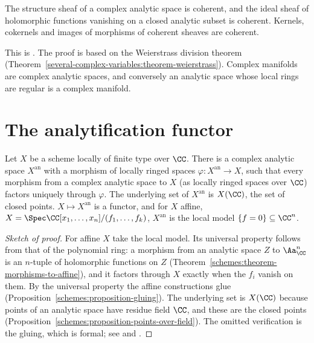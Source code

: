 \begin{theorem}\label{gaga:theorem-oka-cartan}
The structure sheaf of a complex analytic space is coherent, and the ideal sheaf of holomorphic functions vanishing on a closed analytic subset is coherent.
Kernels, cokernels and images of morphisms of coherent sheaves are coherent.
\end{theorem}

This is \cite[Chapters 2 and 4]{grauert-remmert}. The proof is based on the Weierstrass division theorem
(Theorem~\ref{several-complex-variables:theorem-weierstrass}). Complex manifolds are complex analytic spaces, and conversely an analytic space whose local
rings are regular is a complex manifold.

\section{The analytification functor}\label{gaga:section-analytification}

\begin{proposition}\label{gaga:proposition-analytification}
Let $X$ be a scheme locally of finite type over $\CC$. There is a complex analytic space $X^{\mathrm{an}}$ with a morphism of locally ringed spaces
$\varphi \colon X^{\mathrm{an}} \to X$, such that every morphism from a complex analytic space to $X$ (as locally ringed spaces over $\CC$) factors uniquely through
$\varphi$. The underlying set of $X^{\mathrm{an}}$ is $X(\CC)$, the set of closed points. $X \mapsto X^{\mathrm{an}}$ is a functor, and for $X$ affine,
$X = \Spec\CC[x_1, \ldots, x_n]/(f_1, \ldots, f_k)$, $X^{\mathrm{an}}$ is the local model $\{f = 0\} \subseteq \CC^n$.
\end{proposition}

\begin{proof}[Sketch of proof]
For affine $X$ take the local model. Its universal property follows from that of the polynomial ring: a morphism from an analytic space $Z$ to $\Aa^n_\CC$ is an
$n$-tuple of holomorphic functions on $Z$ (Theorem~\ref{schemes:theorem-morphisms-to-affine}), and it factors through $X$ exactly when the $f_i$ vanish on them. By the
universal property the affine constructions glue (Proposition~\ref{schemes:proposition-gluing}). The underlying set is $X(\CC)$ because points of an analytic space
have residue field $\CC$, and these are the closed points (Proposition~\ref{schemes:proposition-points-over-field}). The omitted verification is the gluing,
which is formal; see \cite[Appendix B]{hartshorne-ag} and \cite[Expos\'e XII]{sga1}.
\end{proof}

